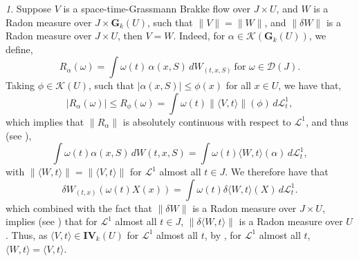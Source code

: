 \documentclass{article}
\theoremstyle{plain}
\theoremstyle{definition}
\theoremstyle{plain}
\theoremstyle{remark}
\newtheorem{propparagraph}[theorem]{}
\theoremstyle{remark}
\theoremstyle{plain}
\begin{document}
\begin{propparagraph}\label{proppar:rectifiablity of Brakke flow}
    Suppose $V$ is a space-time-Grassmann Brakke flow over $J \times U$, and $W$ is a Radon measure over $J \times \mathbf{G}_{k} (U)$, such that $\| V \| = \| W \|$, and $\| \delta W \|$ is a Radon measure over $J \times U$, then $V = W$. 
    Indeed, for $\alpha \in \mathscr{K} (\mathbf{G}_{k} (U))$, we define, 
    \begin{equation*}
        \textstyle R_{\alpha} (\omega) = \int \omega (t) \, \alpha (x, S) \, d W_{(t, x, S)} \ \text{for $\omega \in \mathscr D(J)$}.
    \end{equation*}
    Taking $\phi \in \mathscr{K} (U)$, such that $|\alpha (x, S)| \leq \phi (x)$ for all $x \in U$, we have that, 
    \begin{equation*}
        \textstyle |R_{\alpha} (\omega)| \leq R_{\phi} (\omega) = \int \omega (t) \| \langle V, t \rangle \| (\phi) \, d \mathscr{L}^{1}_{t},
    \end{equation*}
    which implies that $\| R_{\alpha} \|$ is absolutely continuous with respect to $\mathscr{L}^{1}$, and thus (see \cite[3.4(2)]{Menne-WDFV}),
    \begin{equation*}
        \textstyle \int \omega (t) \alpha (x, S) \, d W (t, x, S) = \int \omega (t) \langle W, t \rangle (\alpha) \, d \mathscr{L}^{1}_{t},  
    \end{equation*}
    with $\| \langle W, t \rangle \| = \| \langle V, t \rangle \|$ for $\mathscr{L}^{1}$ almost all $t \in J$.
    We therefore have that
    \begin{equation*}
        \textstyle \delta W_{(t, x)} (\omega (t) X (x)) = \int \omega (t) \delta \langle W, t\rangle (X) \, d \mathscr{L}^{1}_{t}.
    \end{equation*}
    which combined with the fact that $\| \delta W \|$ is a Radon measure over $J \times U$, implies (see \cite[3.4]{Menne-WDFV}) that for $\mathscr{L}^{1}$ almost all $t \in J$, $\| \delta \langle W, t \rangle \|$ is a Radon measure over $U$. 
    Thus, as $\langle V, t \rangle \in \mathbf{IV}_{k} (U)$ for $\mathscr{L}^{1}$ almost all $t$, by \cite[5.5(1)]{Allard1972OnTF}, for $\mathscr{L}^{1}$ almost all $t$, $\langle W, t \rangle = \langle V, t \rangle$.
\end{propparagraph}
\end{document}
